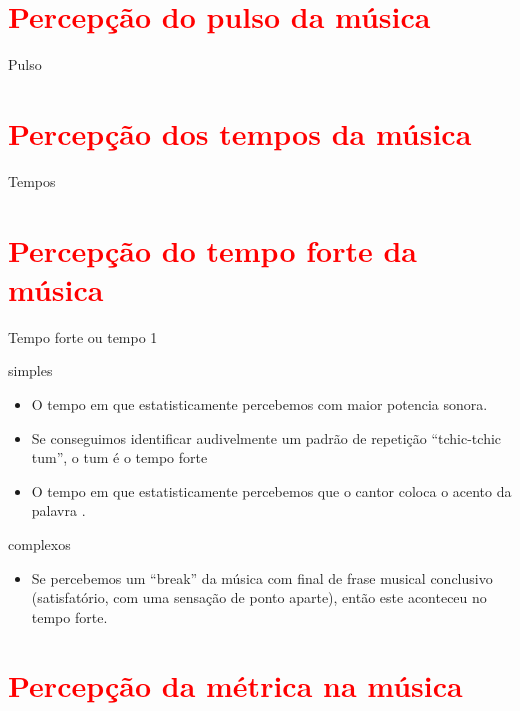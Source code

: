 \section{\textcolor{red}{Percepção do pulso da música}}
Pulso

\section{\textcolor{red}{Percepção dos tempos da música}}
Tempos

\section{\textcolor{red}{Percepção do tempo forte da música}}
Tempo forte ou tempo 1

simples
\begin{itemize}
\item O tempo em que estatisticamente percebemos com maior potencia sonora. 
\item Se conseguimos identificar audivelmente um padrão de repetição ``tchic-tchic tum'', o tum é o tempo forte
\item O tempo em que estatisticamente percebemos que o cantor  coloca o acento da palavra \cite[pp. 149]{medteoria}. 
\end{itemize}

complexos 
\begin{itemize}
\item Se percebemos um ``break'' da música com final de frase musical conclusivo 
(satisfatório, com uma sensação de ponto aparte), então este aconteceu no tempo forte.
\end{itemize}


\section{\textcolor{red}{Percepção da métrica na música}}



